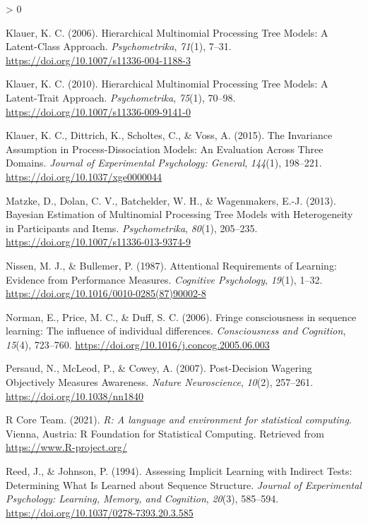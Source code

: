 \documentclass[
  english,
  man]{apa6}
\newlength{\cslhangindent}
\newenvironment{CSLReferences}[2] %
 {%
  \setlength{\parindent}{0pt}
  \ifodd #1 \everypar{\setlength{\hangindent}{\cslhangindent}}\ignorespaces\fi
  \ifnum #2 > 0
  \setlength{\parskip}{#2\baselineskip}
  \fi
 }%
 {}
\begin{document}
\begin{CSLReferences}{1}{0}
\leavevmode\hypertarget{ref-klauer_hierarchical_2006}{}%
Klauer, K. C. (2006). Hierarchical {Multinomial Processing Tree Models}: {A Latent}-{Class Approach}. \emph{Psychometrika}, \emph{71}(1), 7--31. \url{https://doi.org/10.1007/s11336-004-1188-3}

\leavevmode\hypertarget{ref-klauer_hierarchical_2010}{}%
Klauer, K. C. (2010). Hierarchical {Multinomial Processing Tree Models}: {A Latent}-{Trait Approach}. \emph{Psychometrika}, \emph{75}(1), 70--98. \url{https://doi.org/10.1007/s11336-009-9141-0}

\leavevmode\hypertarget{ref-klauer_invariance_2015}{}%
Klauer, K. C., Dittrich, K., Scholtes, C., \& Voss, A. (2015). The {Invariance Assumption} in {Process}-{Dissociation Models}: {An Evaluation Across Three Domains}. \emph{Journal of Experimental Psychology: General}, \emph{144}(1), 198--221. \url{https://doi.org/10.1037/xge0000044}

\leavevmode\hypertarget{ref-matzke_bayesian_2013}{}%
Matzke, D., Dolan, C. V., Batchelder, W. H., \& Wagenmakers, E.-J. (2013). Bayesian {Estimation} of {Multinomial Processing Tree Models} with {Heterogeneity} in {Participants} and {Items}. \emph{Psychometrika}, \emph{80}(1), 205--235. \url{https://doi.org/10.1007/s11336-013-9374-9}

\leavevmode\hypertarget{ref-nissen_attentional_1987}{}%
Nissen, M. J., \& Bullemer, P. (1987). Attentional {Requirements} of {Learning}: {Evidence} from {Performance Measures}. \emph{Cognitive Psychology}, \emph{19}(1), 1--32. \url{https://doi.org/10.1016/0010-0285(87)90002-8}

\leavevmode\hypertarget{ref-norman_fringe_2006}{}%
Norman, E., Price, M. C., \& Duff, S. C. (2006). Fringe consciousness in sequence learning: {The} influence of individual differences. \emph{Consciousness and Cognition}, \emph{15}(4), 723--760. \url{https://doi.org/10.1016/j.concog.2005.06.003}

\leavevmode\hypertarget{ref-persaud_postdecision_2007}{}%
Persaud, N., McLeod, P., \& Cowey, A. (2007). Post-{Decision Wagering Objectively Measures Awareness}. \emph{Nature Neuroscience}, \emph{10}(2), 257--261. \url{https://doi.org/10.1038/nn1840}

\leavevmode\hypertarget{ref-R-base}{}%
R Core Team. (2021). \emph{R: A language and environment for statistical computing}. Vienna, Austria: R Foundation for Statistical Computing. Retrieved from \url{https://www.R-project.org/}

\leavevmode\hypertarget{ref-reed_assessing_1994}{}%
Reed, J., \& Johnson, P. (1994). Assessing {Implicit Learning} with {Indirect Tests}: {Determining What Is Learned} about {Sequence Structure}. \emph{Journal of Experimental Psychology: Learning, Memory, and Cognition}, \emph{20}(3), 585--594. \url{https://doi.org/10.1037/0278-7393.20.3.585}


\end{CSLReferences}
\end{document}
